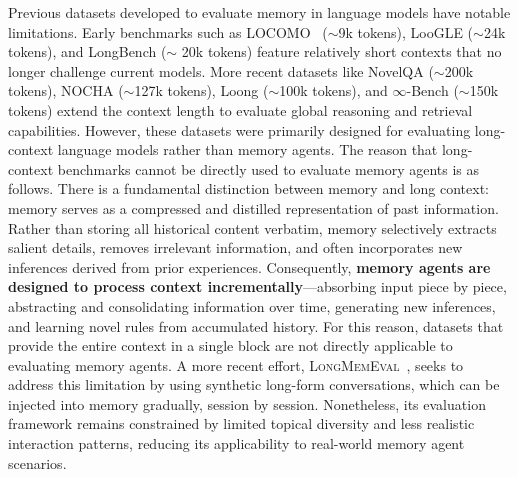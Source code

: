 Previous datasets developed to evaluate memory in language models have notable limitations. Early benchmarks such as \textsc{LOCOMO}~\citep{locomo} ($\sim$9k tokens), LooGLE\citep{LooGLE} ($\sim$24k tokens), and LongBench\citep{longbench} ($\sim$ 20k tokens) feature relatively short contexts that no longer challenge current models. More recent datasets like NovelQA\citep{novelqa} ($\sim$200k tokens), NOCHA\citep{nocha} ($\sim$127k tokens), Loong\citep{loong} ($\sim$100k tokens), and $\infty$-Bench\citep{infinitebench} ($\sim$150k tokens) extend the context length to evaluate global reasoning and retrieval capabilities. However, these datasets were primarily designed for evaluating long-context language models rather than memory agents. 
The reason that long-context benchmarks cannot be directly used to evaluate memory agents is as follows. There is a fundamental distinction between memory and long context: memory serves as a compressed and distilled representation of past information. Rather than storing all historical content verbatim, memory selectively extracts salient details, removes irrelevant information, and often incorporates new inferences derived from prior experiences. Consequently, \textbf{memory agents are designed to process context incrementally}—absorbing input piece by piece, abstracting and consolidating information over time, generating new inferences, and learning novel rules from accumulated history. For this reason, datasets that provide the entire context in a single block are not directly applicable to evaluating memory agents. A more recent effort, \textsc{LongMemEval}~\citep{longmemeval}, seeks to address this limitation by using synthetic long-form conversations, which can be injected into memory gradually, session by session. Nonetheless, its evaluation framework remains constrained by limited topical diversity and less realistic interaction patterns, reducing its applicability to real-world memory agent scenarios. 


